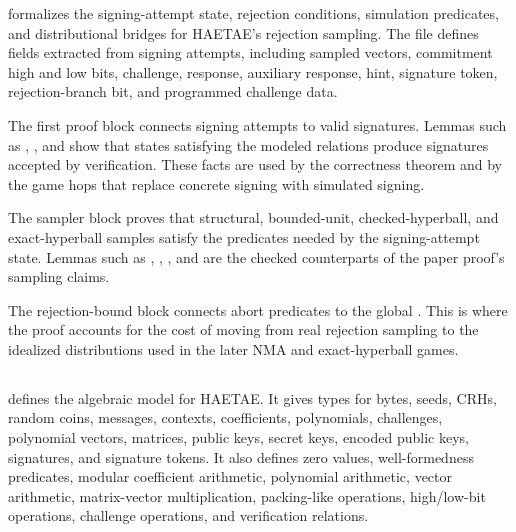  formalizes the signing-attempt state, rejection
conditions, simulation predicates, and distributional bridges for HAETAE's
rejection sampling.  The file defines fields extracted from signing attempts,
including sampled vectors, commitment high and low bits, challenge, response,
auxiliary response, hint, signature token, rejection-branch bit, and programmed
challenge data.

The first proof block connects signing attempts to valid signatures.  Lemmas
such as ,
, and
 show that states satisfying the modeled
relations produce signatures accepted by verification.  These facts are used by
the correctness theorem and by the game hops that replace concrete signing with
simulated signing.

The sampler block proves that structural, bounded-unit, checked-hyperball, and
exact-hyperball samples satisfy the predicates needed by the signing-attempt
state.  Lemmas such as
,
,
, and
 are the checked
counterparts of the paper proof's sampling claims.

The rejection-bound block connects abort predicates to the global
.  This is where the proof accounts for
the cost of moving from real rejection sampling to the idealized distributions
used in the later NMA and exact-hyperball games.

\subsection[HAETAE\_Algebra.ec]{\texorpdfstring{}{HAETAE\_Algebra.ec}}

 defines the algebraic model for HAETAE.  It gives
types for bytes, seeds, CRHs, random coins, messages, contexts, coefficients,
polynomials, challenges, polynomial vectors, matrices, public keys, secret keys,
encoded public keys, signatures, and signature tokens.  It also defines zero
values, well-formedness predicates, modular coefficient arithmetic, polynomial
arithmetic, vector arithmetic, matrix-vector multiplication, packing-like
operations, high/low-bit operations, challenge operations, and verification
relations.

